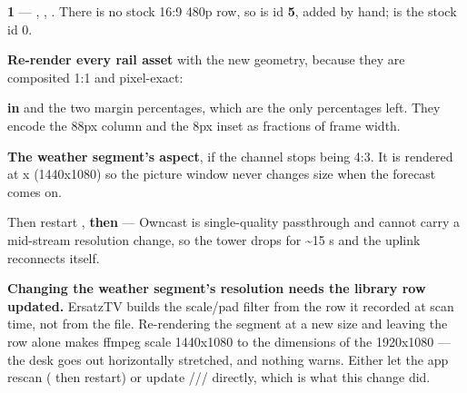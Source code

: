 \documentclass[fontpath=fonts/,logopath=logo/]{riposte-doc}
\begin{document}
\begin{ripnumbers}
\item \textbf{ 1} — , , . There is no stock 16:9 480p row, so  is  id \textbf{5}, added by hand;  is the stock id 0.
\item \textbf{Re-render every rail asset} with the new geometry, because they are composited 1:1 and pixel-exact: 
\item \textbf{ in } and the two margin percentages, which are the only percentages left. They encode the 88px column and the 8px inset as fractions of frame width.
\item \textbf{The weather segment's aspect}, if the channel stops being 4:3. It is rendered at x (1440x1080) so the picture window never changes size when the forecast comes on.
\end{ripnumbers}

Then restart , \textbf{then}  — Owncast is single-quality passthrough and cannot carry a mid-stream resolution change, so the tower drops for \textasciitilde{}15 s and the uplink reconnects itself.

\textbf{Changing the weather segment's resolution needs the library row updated.} ErsatzTV builds the scale/pad filter from the  row it recorded at scan time, not from the file. Re-rendering the segment at a new size and leaving the row alone makes ffmpeg scale 1440x1080 to the dimensions of the  1920x1080 — the desk goes out horizontally stretched, and nothing warns. Either let the app rescan ( then restart) or update  ///  directly, which is what this change did.
\end{document}
